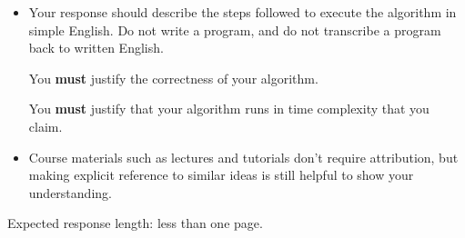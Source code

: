 \documentclass[12pt]{article}
\begin{document}
\begin{rubric}
\begin{itemize}
    \item Your response should describe the steps followed to execute the algorithm in simple English. Do not write a program, and do not transcribe a program back to written English.
    
    You \textbf{must} justify the correctness of your algorithm.
    
    You \textbf{must} justify that your algorithm runs in time complexity that you claim.

    \item Course materials such as lectures and tutorials don't require attribution, but making explicit reference to similar ideas is still helpful to show your understanding.
\end{itemize}
Expected response length: less than one page.
\end{rubric}

\begin{solution}
\end{solution}

\begin{attribution}
\end{attribution}
\end{document}
